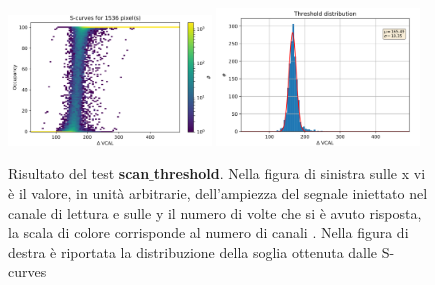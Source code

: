 
\begin{figure}
\centering
\includegraphics[width=0.48\textwidth]{Immagini/Scurves}
\hfill
\includegraphics[width=0.48\textwidth]{Immagini/Threshold}
\caption{Risultato del test \textbf{scan$\_$threshold}. Nella figura di sinistra sulle x vi è il valore, in unità arbitrarie, dell'ampiezza del segnale iniettato nel canale di lettura e sulle y il numero di volte che si è avuto risposta, la scala di colore corrisponde al numero di canali . Nella figura di destra è riportata la distribuzione della soglia ottenuta dalle S-curves}
\label{Threshold}
\label{Scurves}
\end{figure}

